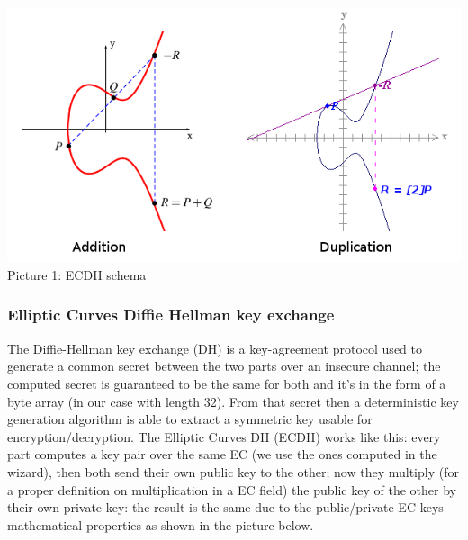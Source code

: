 \documentclass[a4paper,12pt]{article}
\begin{document}
\vspace{1cm}
\begin{center}
\includegraphics[scale=0.7]{images/ec}\\

\vspace{1cm}
Picture 1: ECDH schema\\
\end{center}

\vspace{1cm}
\subsubsection{Elliptic Curves Diffie Hellman key exchange}
The Diffie-Hellman key exchange (DH) is a key-agreement protocol used to generate a common secret between the two parts over an insecure channel; the computed secret is guaranteed to be the same for both and it's in the form of a byte array (in our case with length 32). From that secret then a deterministic key generation algorithm is able to extract a symmetric key usable for encryption/decryption. The Elliptic Curves DH (ECDH) works like this: every part computes a key pair over the same EC (we use the ones computed in the wizard), then both send their own public key to the other; now they multiply (for a proper definition on multiplication in a EC field) the public key of the other by their own private key: the result is the same due to the public/private EC keys mathematical properties as shown in the picture below.\\
\end{document}
